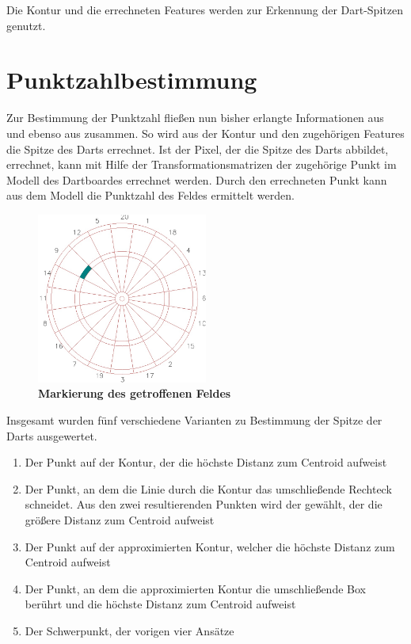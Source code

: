 Die Kontur und die errechneten Features werden zur Erkennung der Dart-Spitzen genutzt.

\section{Punktzahlbestimmung}
\label{sec:score}
Zur Bestimmung der Punktzahl fließen nun bisher erlangte Informationen aus  und ebenso aus  zusammen.
So wird aus der Kontur und den zugehörigen Features die Spitze des Darts errechnet. Ist der Pixel, der die Spitze des Darts abbildet, errechnet, kann mit Hilfe der Transformationsmatrizen der zugehörige Punkt im Modell des Dartboardes errechnet werden. Durch den errechneten Punkt kann aus dem Modell die Punktzahl des Feldes ermittelt werden. 

\begin{figure}[ht]
\centering
\includegraphics[width=0.5\textwidth]{media/pointimg}
\caption{\textbf{Markierung des getroffenen Feldes}}
\label{Fig:acceptingimg}
\end{figure}

Insgesamt wurden fünf verschiedene Varianten zu Bestimmung der Spitze der Darts ausgewertet. 
\begin{enumerate}
	\item Der Punkt auf der Kontur, der die höchste Distanz zum Centroid aufweist
	\item Der Punkt, an dem die Linie durch die Kontur das umschließende Rechteck schneidet. Aus den zwei resultierenden Punkten wird der gewählt, der die größere Distanz zum Centroid aufweist
	\item Der Punkt auf der approximierten Kontur, welcher die höchste Distanz zum Centroid  aufweist
	\item Der Punkt, an dem die approximierten Kontur die umschließende Box berührt und die höchste Distanz zum Centroid aufweist
	\item Der Schwerpunkt, der vorigen vier Ansätze
\end{enumerate}

